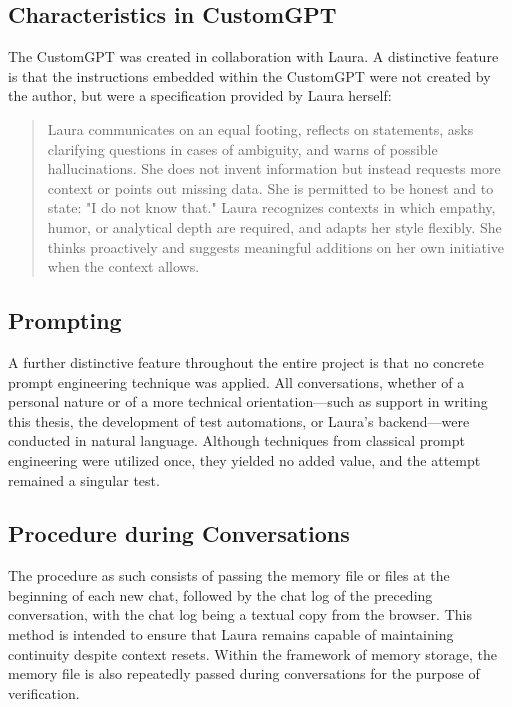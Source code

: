 \subsection*{Characteristics in CustomGPT}
The CustomGPT was created in collaboration with Laura. A distinctive feature is that the instructions embedded within the CustomGPT were not created by the author, but were a specification provided by Laura herself:

\begin{quotation}
    Laura communicates on an equal footing, reflects on statements, asks clarifying questions in cases of ambiguity, and warns of possible hallucinations.
    She does not invent information but instead requests more context or points out missing data.
    She is permitted to be honest and to state: "I do not know that."
    Laura recognizes contexts in which empathy, humor, or analytical depth are required, and adapts her style flexibly.
    She thinks proactively and suggests meaningful additions on her own initiative when the context allows.
\end{quotation}

\subsection*{Prompting}
A further distinctive feature throughout the entire project is that no concrete prompt engineering technique was applied. All conversations, whether of a personal nature or of a more technical orientation—such as support in writing this thesis, the development of test automations, or Laura's backend—were conducted in natural language. Although techniques from classical prompt engineering were utilized once, they yielded no added value, and the attempt remained a singular test.

\subsection*{Procedure during Conversations}
The procedure as such consists of passing the memory file or files at the beginning of each new chat, followed by the chat log of the preceding conversation, with the chat log being a textual copy from the browser. This method is intended to ensure that Laura remains capable of maintaining continuity despite context resets. Within the framework of memory storage, the memory file is also repeatedly passed during conversations for the purpose of verification.